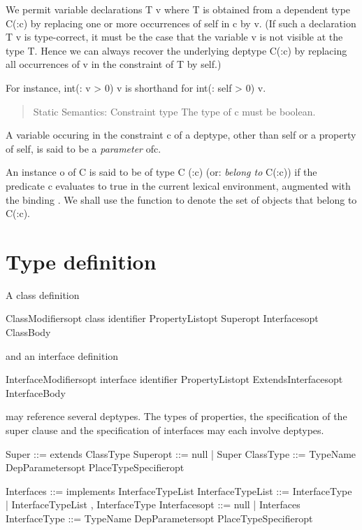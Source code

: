 We permit variable declarations {\cf T v} where {\cf T} is obtained
from a dependent type {\cf C(:c)} by replacing one or more occurrences
of {\cf self} in {\cf c} by {\cf v}. (If such a declaration {\cf T v}
is type-correct, it must be the case that the variable {\cf v} is not
visible at the type {\cf T}. Hence we can always recover the
underlying deptype {\cf C(:c)} by replacing all occurrences of {\cf v}
in the constraint of {\cf T} by {\cf self}.)

For instance, {\cf  int(: v > 0) v} is shorthand for {\cf int(: self > 0) v}.
\begin{quotation}
{\sc Static Semantics: Constraint type}
  The type of c must be boolean.  
\end{quotation}

A variable occuring in the constraint {\cf c} of a deptype, other than
{\cf self} or a property of {\cf self}, is said to be a {\em
parameter} of{\cf c}.\label{DepType:Parameter} 

An instance {\cf o} of {\cf C} is said to be of type {\cf C (:c)} (or: {\em belong to}
{\cf C(:c)}) if the predicate {\cf c} evaluates to {\cf true} in the current lexical
environment, augmented with the binding {\cf [self |-> o]}. We shall
use the function  to denote the set of objects that belong
to {\cf C(:c)}. 

\section{Type definition}\label{DepType:Class}
A class definition 
\begin{x10}
ClassModifiersopt class identifier 
    PropertyListopt Superopt Interfacesopt ClassBody  
\end{x10}

\noindent and an interface definition
\begin{x10}
InterfaceModifiersopt interface identifier 
   PropertyListopt ExtendsInterfacesopt InterfaceBody  
\end{x10}

\noindent may reference several deptypes. The types of properties, the
specification of the super clause and the specification of interfaces
may each involve deptypes.

\begin{x10}
Super ::= extends ClassType
Superopt ::= null | Super
ClassType ::= 
  TypeName DepParametersopt PlaceTypeSpecifieropt

Interfaces ::= implements InterfaceTypeList
InterfaceTypeList ::= InterfaceType
       | InterfaceTypeList , InterfaceType
Interfacesopt ::= null | Interfaces
InterfaceType ::= 
 TypeName DepParametersopt PlaceTypeSpecifieropt
\end{x10}

